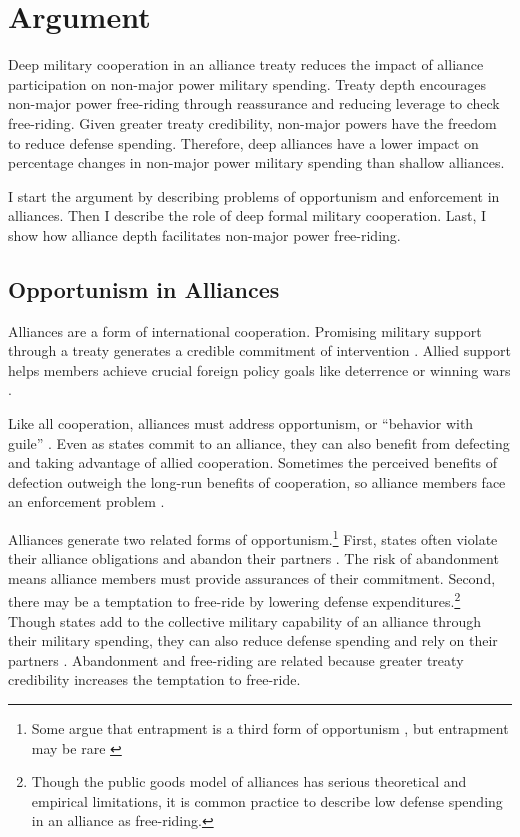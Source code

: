 \documentclass[12pt]{article}
\begin{document}
\section*{Argument}

Deep military cooperation in an alliance treaty reduces the impact of alliance participation on non-major power military spending.
Treaty depth encourages non-major power free-riding through reassurance and reducing leverage to check free-riding.  
Given greater treaty credibility, non-major powers have the freedom to reduce defense spending.
Therefore, deep alliances have a lower impact on percentage changes in non-major power military spending than shallow alliances. 


I start the argument by describing problems of opportunism and enforcement in alliances. 
Then I describe the role of deep formal military cooperation. 
Last, I show how alliance depth facilitates non-major power free-riding. 


\subsection*{Opportunism in Alliances}

Alliances are a form of international cooperation. 
Promising military support through a treaty generates a credible commitment of intervention \citep{Fearon1997, Morrow2000}. 
Allied support helps members achieve crucial foreign policy goals like deterrence or winning wars \citep{Walt1990, Snyder1997}. 


Like all cooperation, alliances must address opportunism, or ``behavior with guile'' \citep{Williamson1985}. 
Even as states commit to an alliance, they can also benefit from defecting and taking advantage of allied cooperation. 
Sometimes the perceived benefits of defection outweigh the long-run benefits of cooperation, so alliance members face an enforcement problem \citep{Fearon1998a, Koremenosetal2001}.


Alliances generate two related forms of opportunism.\footnote{Some argue that entrapment is a third form of opportunism \citep{Snyder1984}, but entrapment may be rare \citep{Kim2011, Beckley2015}}
First, states often violate their alliance obligations and abandon their partners \citep{BerkemeierFuhrmann2018}.
The risk of abandonment means alliance members must provide assurances of their commitment. 
Second, there may be a temptation to free-ride by lowering defense expenditures.\footnote{Though the public goods model of alliances has serious theoretical and empirical limitations, it is common practice to describe low defense spending in an alliance as free-riding.}
Though states add to the collective military capability of an alliance through their military spending, they can also reduce defense spending and rely on their partners \citep{OlsonZeckhauser1966, Morrow1993, Conybeare1994, SandlerHartley2001}.
Abandonment and free-riding are related because greater treaty credibility increases the temptation to free-ride. 
\end{document}
